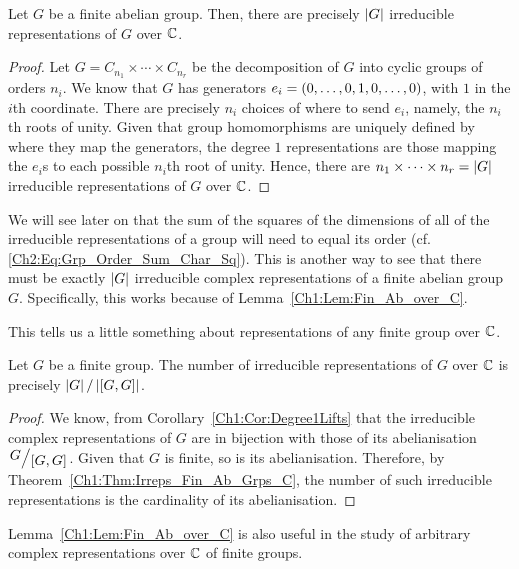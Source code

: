 \begin{boxtheorem}\label{Ch1:Thm:Irreps_Fin_Ab_Grps_C}
    Let $G$ be a finite abelian group. Then, there are precisely $\left\lvert G \right\rvert$ irreducible representations of $G$ over $\mathbb{C}$.
\end{boxtheorem}
\begin{proof}
    Let $G = C_{n_1} \times \cdots \times C_{n_r}$ be the decomposition of $G$ into cyclic groups of orders $n_i$. We know that $G$ has generators $e_i = \left( 0, \ldots, 0, 1, 0, \ldots, 0 \right)$, with $1$ in the $i$th coordinate. There are precisely $n_i$ choices of where to send $e_i$, namely, the $n_i$th roots of unity. Given that group homomorphisms are uniquely defined by where they map the generators, the degree $1$ representations are those mapping the $e_i$s to each possible $n_i$th root of unity. Hence, there are $n_1 \times \cdots \times n_r = \left\lvert G \right\rvert$ irreducible representations of $G$ over $\mathbb{C}$.
\end{proof}
\begin{remark}
    We will see later on that the sum of the squares of the dimensions of all of the irreducible representations of a group will need to equal its order (cf. \eqref{Ch2:Eq:Grp_Order_Sum_Char_Sq}). This is another way to see that there must be exactly $\left\lvert G \right\rvert$ irreducible complex representations of a finite abelian group $G$. Specifically, this works because of Lemma~\ref{Ch1:Lem:Fin_Ab_over_C}.
\end{remark}
This tells us a little something about representations of any finite group over $\mathbb{C}$.
\begin{corollary}
    Let $G$ be a finite group. The number of irreducible representations of $G$ over $\mathbb{C}$ is precisely $\left\lvert G \right\rvert / \left\lvert \left[ G, G \right] \right\rvert$.
\end{corollary}
\begin{proof}
    We know, from Corollary~\ref{Ch1:Cor:Degree1Lifts} that the irreducible complex representations of $G$ are in bijection with those of its abelianisation $\quotient{G}{\brac{G, G}}$. Given that $G$ is finite, so is its abelianisation. Therefore, by Theorem~\ref{Ch1:Thm:Irreps_Fin_Ab_Grps_C}, the number of such irreducible representations is the cardinality of its abelianisation.
\end{proof}

Lemma~\ref{Ch1:Lem:Fin_Ab_over_C} is also useful in the study of arbitrary complex representations over $\mathbb{C}$ of finite groups.

